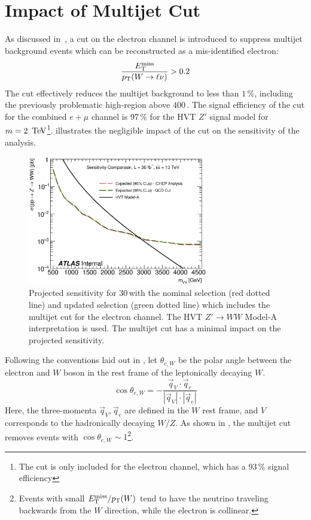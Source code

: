 \chapter{Impact of Multijet Cut}
\label{ch:costhetastar}

As discussed in~\App{\ref{ch:qcd}}, a cut on the electron channel is introduced to suppress multijet background events which can be reconstructed as a mis-identified electron:
$$\frac{E_{\text{T}}^{\text{miss}}}{p_{\text{T}}(W\rightarrow\ell\nu)} > 0.2$$
The cut effectively reduces the multijet background to less than $1$\,\%, including the previously problematic high-\pt region above $400$\,\GeV. The signal efficiency of the cut for the combined $e+\mu$ channel is 97\,\% for the HVT $Z'$ signal model for $m=2\,\TeV$\footnote{
	The cut is only included for the electron channel, which has a 93\,\% signal efficiency 
}. \Fig{\ref{fig:sens_mj}} illustrates the negligible impact of the cut on the sensitivity of the analysis.

\begin{figure}[htbp]
\begin{center}
\includegraphics[width=0.7\textwidth]{figures/Appendix/sens_comparison}
\end{center}
\caption[Sensitivity comparison of multijet cut]{Projected sensitivity for 30\,\ifb with the nominal selection (red dotted line) and updated selection (green dotted line) which includes the multijet cut for the electron channel. The HVT $Z'\rightarrow WW$ Model-A interpretation is used. The multijet cut has a minimal impact on the projected sensitivity.}
\label{fig:sens_mj}
\end{figure}

Following the conventions laid out in , let $\theta_{e,W}$ be the polar angle between the electron and $W$ boson in the rest frame of the leptonically decaying $W$.
$$\cos\theta_{e,W} =  -\frac{\vec{q}_V\cdot\vec{q}_e}{|\vec{q}_V|\cdot|\vec{q}_e|}$$
Here, the three-momenta $\vec{q}_V, \vec{q}_e$ are defined in the $W$ rest frame, and $V$ corresponds to the hadronically decaying $W/Z$. As shown in \Fig{\ref{fig:costhetastar}}, the multijet cut removes events with $\cos\theta_{e,W}\sim1$\footnote{
	Events with small $E_{\text{T}}^{\text{miss}}/p_{\text{T}}(W)$ tend to have the neutrino traveling backwards from the $W$ direction, while the electron is collinear. 
}.

